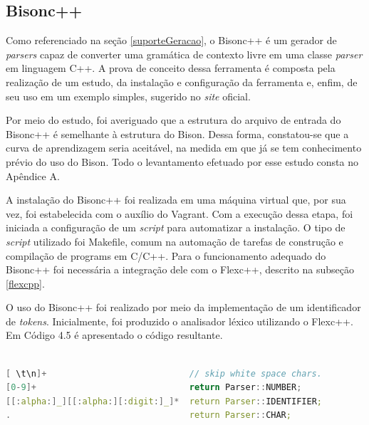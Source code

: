 \subsection{Bisonc++}
Como referenciado na seção \ref{suporteGeracao}, o Bisonc++ é um gerador de \textit{parsers} capaz de converter uma gramática de contexto livre em uma classe \textit{parser} em linguagem C++. A prova de conceito dessa ferramenta é composta pela realização de um estudo, da instalação e configuração da ferramenta e, enfim, de seu uso em um exemplo simples, sugerido no \textit{site} oficial.
\par
\indent Por meio do estudo, foi averiguado que a estrutura do arquivo de entrada do Bisonc++ é semelhante à estrutura do Bison. Dessa forma, constatou-se que a curva de aprendizagem seria aceitável, na medida em que já se tem conhecimento prévio do uso do Bison. Todo o levantamento efetuado por esse estudo consta no Apêndice A.
\par
\indent A instalação do Bisonc++ foi realizada em uma máquina virtual que, por sua vez, foi estabelecida com o auxílio do Vagrant. Com a execução dessa etapa, foi iniciada a configuração de um \textit{script} para automatizar a instalação. O tipo de \textit{script} utilizado foi Makefile, comum na automação de tarefas de construção e compilação de programs em C/C++. Para o funcionamento adequado do Bisonc++ foi necessária a integração dele com o Flexc++, descrito na subseção \ref{flexcpp}.
\par
\indent O uso do Bisonc++ foi realizado por meio da implementação de um identificador de \textit{tokens}. Inicialmente, foi produzido o analisador léxico utilizando o Flexc++. Em Código 4.5 é apresentado o código resultante.

\begin{lstlisting}[language=C++, label=analisadorLexicoPCB, caption=Analisador Léxico da Prova de Conceito do Bisonc++]
%%

[ \t\n]+                            // skip white space chars.
[0-9]+                              return Parser::NUMBER;
[[:alpha:]_][[:alpha:][:digit:]_]*  return Parser::IDENTIFIER;
.                                   return Parser::CHAR;
\end{lstlisting}

